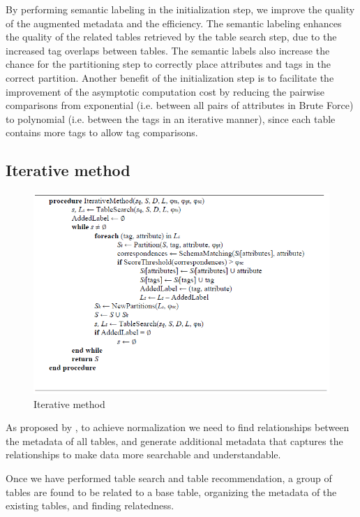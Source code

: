 By performing semantic labeling in the initialization step, we improve the quality of the augmented metadata and the efficiency. The semantic labeling enhances the quality of the related tables retrieved by the table search step, due to the increased tag overlaps between tables. The semantic labels also increase the chance for the partitioning step to correctly place attributes and tags in the correct partition. Another benefit of the initialization step is to facilitate the improvement of the asymptotic computation cost by reducing the pairwise comparisons from exponential (i.e. between all pairs of attributes in Brute Force) to polynomial (i.e. between the tags in an iterative manner), since each table contains more tags to allow tag comparisons.

\subsection{Iterative method}
\label{ssec:IterativeMethod}

\begin{figure}
  \centering
  \includegraphics[width=5in]{figures/iterative-method.png}
  \caption{Iterative method}
  \label{fig:iterative-method}
\end{figure}

As proposed by \cite{Smith2011Unity}, to achieve normalization we need to find relationships between the metadata of all tables, and generate additional metadata that captures the relationships to make data more searchable and understandable.

Once we have performed table search and table recommendation, a group of tables are found to be related to a base table, organizing the metadata of the existing tables, and finding relatedness.

